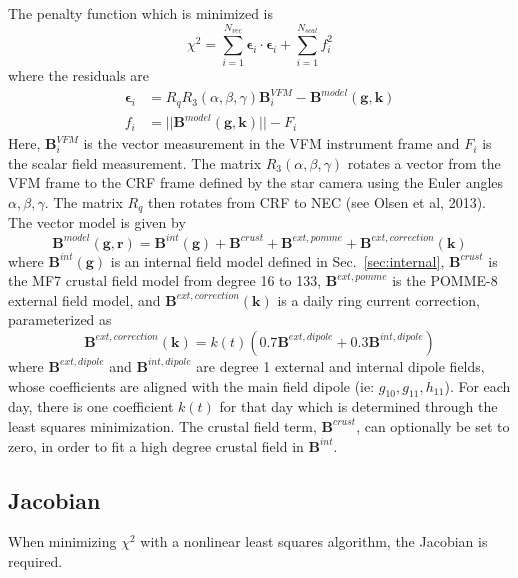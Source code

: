 \documentclass{article}
\begin{document}
The penalty function which is minimized is
\begin{equation}
\chi^2 = \sum_{i=1}^{N_{vec}} \boldsymbol{\epsilon}_i \cdot \boldsymbol{\epsilon}_i + \sum_{i=1}^{N_{scal}} f_i^2
\end{equation}
where the residuals are
\begin{align}
\boldsymbol{\epsilon}_i & = R_q R_3(\alpha,\beta,\gamma) \mathbf{B}^{VFM}_i - \mathbf{B}^{model}(\mathbf{g},\mathbf{k}) \\
f_i & = || \mathbf{B}^{model}(\mathbf{g},\mathbf{k}) || - F_i
\end{align}
Here, $\mathbf{B}^{VFM}_i$ is the vector measurement in the VFM instrument frame and $F_i$ is the scalar field
measurement. The matrix $R_3(\alpha,\beta,\gamma)$ rotates a vector from the VFM frame to the CRF frame defined
by the star camera using the Euler angles $\alpha,\beta,\gamma$. The matrix $R_q$ then rotates from CRF to NEC
(see Olsen et al, 2013). The vector model is given by
\begin{equation}
\mathbf{B}^{model}(\mathbf{g},\mathbf{r}) = \mathbf{B}^{int}(\mathbf{g}) + \mathbf{B}^{crust} + \mathbf{B}^{ext,pomme} + \mathbf{B}^{ext,correction}(\mathbf{k})
\end{equation}
where $\mathbf{B}^{int}(\mathbf{g})$ is an internal field model defined in Sec.~\ref{sec:internal},
$\mathbf{B}^{crust}$ is the MF7 crustal field model from degree 16 to 133,
$\mathbf{B}^{ext,pomme}$ is the POMME-8 external field model, and $\mathbf{B}^{ext,correction}(\mathbf{k})$ is a daily
ring current correction, parameterized as
\begin{equation}
\mathbf{B}^{ext,correction}(\mathbf{k}) = k(t) \left( 0.7 \mathbf{B}^{ext,dipole} + 0.3 \mathbf{B}^{int,dipole} \right)
\end{equation}
where $\mathbf{B}^{ext,dipole}$ and $\mathbf{B}^{int,dipole}$ are degree 1 external and internal dipole fields,
whose coefficients are aligned with the main field dipole (ie: $g_{10},g_{11},h_{11}$). For each day, there is
one coefficient $k(t)$ for that day which is determined through the least
squares minimization. The crustal field term, $\mathbf{B}^{crust}$, can
optionally be set to zero, in order to fit a high degree crustal field
in $\mathbf{B}^{int}$.

\subsection{Jacobian}

When minimizing $\chi^2$ with a nonlinear least squares algorithm, the Jacobian
is required.
\end{document}
